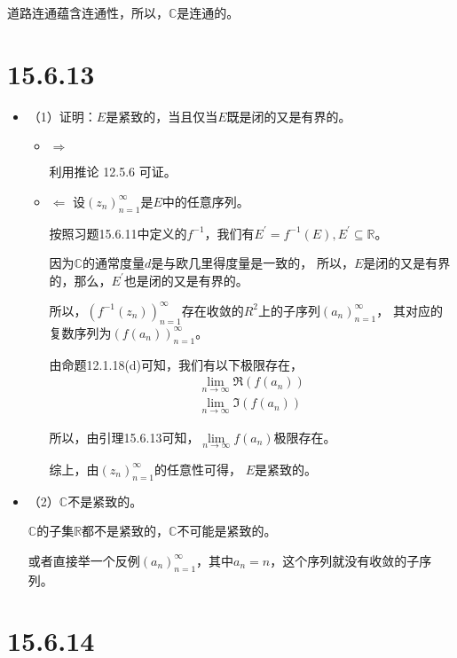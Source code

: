 \documentclass{article}
\begin{document}
道路连通蕴含连通性，所以，$\mathbb{C}$是连通的。

\section*{15.6.13}


\begin{itemize}
  \item （1）证明：$E$是紧致的，当且仅当$E$既是闭的又是有界的。
        \begin{itemize}
          \item $\Rightarrow$

                利用推论 12.5.6 可证。

          \item $\Leftarrow$
                设$(z_n)_{n = 1}^\infty$是$E$中的任意序列。

                按照习题15.6.11中定义的$f^{-1}$，我们有$E^\prime = f^{-1}(E), E^\prime \subseteq \mathbb{R}$。

                因为$\mathbb{C}$的通常度量$d$是与欧几里得度量是一致的，
                所以，$E$是闭的又是有界的，那么，$E^\prime$也是闭的又是有界的。

                所以，$(f^{-1}(z_n))_{n = 1}^\infty$存在收敛的$R^2$上的子序列$(a_n)_{n = 1}^\infty$，
                其对应的复数序列为$(f(a_n))_{n = 1}^\infty$。

                由命题12.1.18(d)可知，我们有以下极限存在，
                \begin{align*}
                  \lim\limits_{n \to \infty} \mathfrak{R} (f(a_n)) \\
                  \lim\limits_{n \to \infty} \mathfrak{I} (f(a_n))
                \end{align*}

                所以，由引理15.6.13可知，$\lim\limits_{n \to \infty} f(a_n)$极限存在。

                综上，由$(z_n)_{n = 1}^\infty$的任意性可得， $E$是紧致的。
        \end{itemize}

  \item （2）$\mathbb{C}$不是紧致的。

        $\mathbb{C}$的子集$\mathbb{R}$都不是紧致的，$\mathbb{C}$不可能是紧致的。

        或者直接举一个反例$(a_n)_{n = 1}^\infty$，其中$a_n = n$，这个序列就没有收敛的子序列。

\end{itemize}

\section*{15.6.14}
\end{document}
